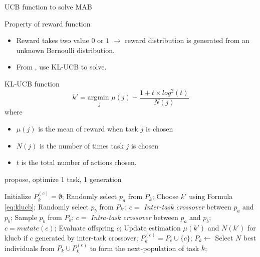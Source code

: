 \begin{frame}{UCB function to solve MAB}
    \begin{block}{Property of reward function}
        \begin{itemize}
            \item Reward takes two value $0$ or $1$ $\rightarrow$ reward distribution is generated from an unknown Bernoulli distribution.
            \item From , use KL-UCB to solve.
        \end{itemize}
    \end{block}
    \begin{block}{KL-UCB function}
        \begin{equation}
            k' = \underset{j}{\text{argmin }} \mu(j) + \frac{1 + t \times log^2(t) }{N(j)}
            \label{eq:klucb}
        \end{equation}
        where 
        \begin{itemize}
            \item $\mu(j)$ is the mean of reward when task $j$ is chosen
            \item $N(j)$ is the number of times task $j$ is chosen
            \item $t$ is the total number of actions chosen.
        \end{itemize}
    \end{block}
\end{frame}

\begin{frame}{\gls{propose}, optimize 1 task, 1 generation}
    \begin{algorithm}[H]
        \fontsize{6pt}{10}\selectfont
        \caption{\fontsize{6pt}{10}\selectfont\gls{propose} on each generation of $k^{th}$ task}
        \begin{algorithmic}[1]
            \State Initialize $P^{(c)}_k=\emptyset$;
                \State Randomly select $p_a$ from $P_k$;
                    \State Choose $k'$ using Formula \eqref{eq:klucb};
                    \State Randomly select $p_b$ from $P_{k'}$;
                    \State $c = $ \emph{Inter-task crossover} between  $p_a$ and $p_b$;
                \Else
                    \State Sample $p_b$ from $P_k$;
                    \State $c = $ \emph{Intra-task crossover} between  $p_a$ and $p_b$;
                \EndIf
                \State $c = mutate(c)$;
                \State Evaluate offspring $c$;
                \State Update estimation $\mu(k')$ and $N(k')$ for \gls{klucb} if $c$ generated by inter-task crossover;
                \State $P_k^{(c)} = P_c \cup \{c\}$;
            \EndWhile
            \State $P_k \leftarrow$ Select $N$ best individuals from $P_k \cup P_k^{(c)}$ to form the next-population of task $k$;
        \end{algorithmic}
    \end{algorithm}
\end{frame}


